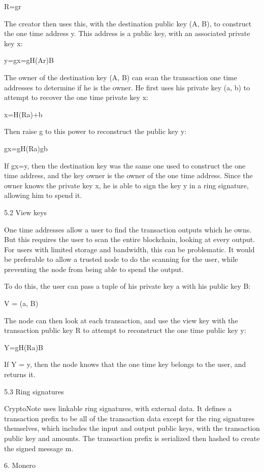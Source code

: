 \documentclass{article}
\begin{document}
	R=gr

The creator then uses this, with the destination public key (A, B), to construct the one time address y.  This address is a public key, with an associated private key x:

y=gx=gH(Ar)B

The owner of the destination key (A, B) can scan the transaction one time addresses to determine if he is the owner.  He first uses his private key (a, b) to attempt to recover the one time private key x:

	x=H(Ra)+b

Then raise g to this power to reconstruct the public key y:

	gx=gH(Ra)gb

If gx=y, then the destination key was the same one used to construct the one time address, and the key owner is the owner of the one time address.  Since the owner knows the private key x, he is able to sign the key y in a ring signature, allowing him to spend it.


5.2 View keys

One time addresses allow a user to find the transaction outputs which he owns.  But this requires the user to scan the entire blockchain, looking at every output.  For users with limited storage and bandwidth, this can be problematic.  It would be preferable to allow a trusted node to do the scanning for the user, while preventing the node from being able to spend the output.

To do this, the user can pass a tuple of his private key a with his public key B:

	V = (a, B)

The node can then look at each transaction, and use the view key with the transaction public key R to attempt to reconstruct the one time public key y:

	Y=gH(Ra)B

If Y = y, then the node knows that the one time key belongs to the user, and returns it.


5.3 Ring signatures

CryptoNote uses linkable ring signatures, with external data.  It defines a transaction prefix to be all of the transaction data except for the ring signatures themselves, which includes the input and output public keys, with the transaction public key and amounts.  The transaction prefix is serialized then hashed to create the signed message m.



6. Monero
\end{document}
